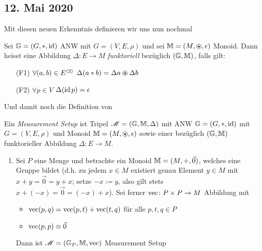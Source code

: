 \subsection*{12. Mai 2020}
Mit diesen neuen Erkenntnis definieren wir uns nun nochmal
\begin{definition}
    Sei $\mathbb{G} = (G, \ast, \operatorname{id})$ ANW mit $G = (V,E,\rho)$ und sei $\M = (M ,\ostar, \epsilon)$ Monoid. Dann heisst eine Abbildung $\Delta \colon E \to M$ \emph{funktoriell} bezüglich $(\mathbb{G},\mathbb{M})$, falls gilt:
    \begin{enumerate}
        \item[(F1)] $\forall(a,b) \in E^{\langle 2\rangle}$ $\Delta(a\ast b) = \Delta a \ostar \Delta b$
        \item[(F2)] $\forall p \in V$ $\Delta(\operatorname{id} p) = \epsilon$
    \end{enumerate}
\end{definition}
Und damit noch die Definition von
\begin{definition}
    Ein \emph{Measurement Setup} ist Tripel $\operatorname{\mathscr M} = (\mathbb{G}, \mathbb{M}, \Delta)$ mit ANW $\mathbb{G} = (G, \ast, \operatorname{id})$ mit $G = (V,E,\rho)$ und Monoid $\M = (M, \ostar, \epsilon)$ sowie einer bezüglich $(\mathbb{G},\mathbb{M})$ funktorieller Abbildung $\Delta\colon E \to M$.
\end{definition}
\begin{example}
    \begin{enumerate}
        \item Sei $P$ eine Menge und betrachte ein Monoid $\mathbb{M} = (M, +, \vec{0})$, welches eine Gruppe bildet (d.h. zu jedem $x \in M$ existiert genau Element $y \in M$ mit $x+y = \vec{0} = y + x$; setze $-x := y$, also gilt stets $x + (-x) = \vec{0} = (-x)+x$). Sei ferner $\operatorname{vec}\colon P\times P \to M$ Abbildung mit
        \begin{itemize}
            \item $\operatorname{vec}(p,q) = \operatorname{vec}(p,t) + \operatorname{vec}(t,q)$ für alle $p,t,q \in P$
            \item $\operatorname{vec}(p,p) \equiv \vec{0}$
        \end{itemize}
        Dann ist $\operatorname{\mathscr M} = (\mathbb{G}_P, \mathbb{M}, \operatorname{vec})$ Measurement Setup
    \end{enumerate}
\end{example}
